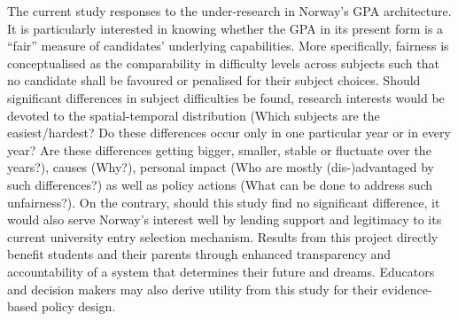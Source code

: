 \documentclass[
    a4paper,            %
    11pt,               %
    stu,                %
    donotrepeattitle,   %
    noextraspace,       %
    floatsintext,       %
    biblatex,           %
    colorlinks=true,        %
    linkcolor=red,          %
    anchorcolor=black,      %
    citecolor=blue,         %
    urlcolor=blue,          %
    bookmarks=true,         %
    bookmarksopen=false,    %
    bookmarksnumbered=true  %
]{apa7}
\begin{document}
The current study responses to the under-research in Norway's GPA architecture. It is particularly interested in knowing whether the GPA in its present form is a ``fair'' measure of candidates' underlying capabilities. More specifically, fairness is conceptualised as the comparability in difficulty levels across subjects such that no candidate shall be favoured or penalised for their subject choices. Should significant differences in subject difficulties be found, research interests would be devoted to the spatial-temporal distribution (Which subjects are the easiest/hardest? Do these differences occur only in one particular year or in every year? Are these differences getting bigger, smaller, stable or fluctuate over the years?), causes (Why?), personal impact (Who are mostly (dis-)advantaged by such differences?) as well as policy actions (What can be done to address such unfairness?). On the contrary, should this study find no significant difference, it would also serve Norway's interest well by lending support and legitimacy to its current university entry selection mechanism. Results from this project directly benefit students and their parents through enhanced transparency and accountability of a system that determines their future and dreams. Educators and decision makers may also derive utility from this study for their evidence-based policy design.



\end{document}
